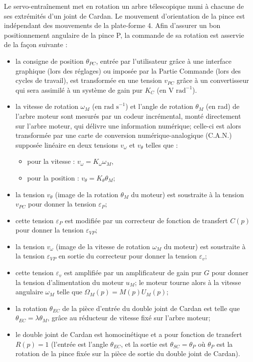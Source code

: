 Le servo-entraînement met en rotation un arbre télescopique muni à chacune de ses extrémités d’un joint de Cardan. Le mouvement d’orientation de la pince est indépendant des mouvements de la plate-forme 4. 
Afin d’assurer un bon positionnement angulaire de la pince P, la commande de sa rotation est asservie de la façon suivante :
\begin{itemize}
\item la consigne de position $\theta_{PC}$, entrée par l’utilisateur grâce à une interface graphique (lors des réglages) ou imposée par la Partie Commande (lors des cycles de travail), est transformée en une tension $v_{PC}$ grâce à un convertisseur qui sera assimilé à un système de gain pur $K_C$ (en $\text{V rad}^{-1}$).
\item la vitesse de rotation $\omega_M$ (en $\text{rad s}^{-1}$) et l’angle de rotation $\theta_M$ (en rad) de l’arbre moteur sont mesurés par un codeur incrémental, monté directement sur l’arbre moteur, qui délivre une information numérique; celle-ci est alors transformée par une carte de conversion numérique-analogique (C.A.N.) supposée linéaire en deux tensions $v_{\omega}$ et $v_{\theta}$ telles que :
\begin{itemize}
\item pour la vitesse : $v_{\omega} =K_{\omega}\omega_M$,
\item pour la position : $v_{\theta} =K_{\theta}\theta_M$;
\end{itemize}
\item la tension $v_{\theta}$  (image de la rotation $\theta_M$ du moteur) est soustraite à la tension $v_{PC}$ pour donner la tension $\varepsilon_P$;
\item cette tension $\varepsilon_P$ est modifiée par un correcteur de fonction de transfert $C(p)$ pour donner la tension $\varepsilon_{VP}$;
\item la tension $v_{\omega}$ (image de la vitesse de rotation $\omega_M$ du moteur) est soustraite à la tension $\varepsilon_{VP}$ en sortie du correcteur pour donner la tension $\varepsilon_v$;
\item cette tension $\varepsilon_v$ est amplifiée par un amplificateur de gain pur $G$ pour donner la tension d’alimentation du moteur $u_M$; le moteur tourne alors à la vitesse angulaire $\omega_M$ telle que $\Omega_M(p) = M(p) U_M(p)$;
\item la rotation $\theta_{EC}$ de la pièce d’entrée du double joint de Cardan est telle que $\theta_{EC} = \lambda \theta_M$, grâce au réducteur de vitesse fixé sur l’arbre moteur;
\item le double joint de Cardan est homocinétique et a pour fonction de transfert $R(p) = 1$ (l’entrée est l’angle $\theta_{EC}$, et la sortie est $\theta_{SC}=\theta_P$ où $\theta_P$ est la rotation de la pince fixée sur la pièce de sortie du double joint de Cardan).
\end{itemize}

